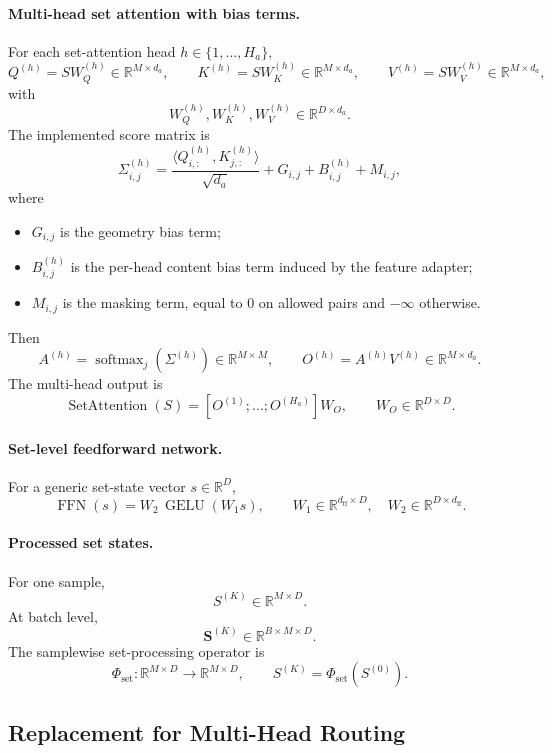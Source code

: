 \paragraph{Multi-head set attention with bias terms.}
For each set-attention head \(h\in\{1,\dots,H_a\}\),
\[
Q^{(h)} = S W_Q^{(h)} \in \mathbb R^{M\times d_a},
\qquad
K^{(h)} = S W_K^{(h)} \in \mathbb R^{M\times d_a},
\qquad
V^{(h)} = S W_V^{(h)} \in \mathbb R^{M\times d_a},
\]
with
\[
W_Q^{(h)},W_K^{(h)},W_V^{(h)}\in\mathbb R^{D\times d_a}.
\]
The implemented score matrix is
\[
\Sigma^{(h)}_{i,j}
=
\frac{\langle Q^{(h)}_{i,:},K^{(h)}_{j,:}\rangle}{\sqrt{d_a}}
+ G_{i,j}
+ B^{(h)}_{i,j}
+ M_{i,j},
\]
where
\begin{itemize}
    \item \(G_{i,j}\) is the geometry bias term;
    \item \(B_{i,j}^{(h)}\) is the per-head content bias term induced by the feature adapter;
    \item \(M_{i,j}\) is the masking term, equal to \(0\) on allowed pairs and \(-\infty\) otherwise.
\end{itemize}
Then
\[
A^{(h)}=\operatorname{softmax}_j(\Sigma^{(h)})\in\mathbb R^{M\times M},
\qquad
O^{(h)}=A^{(h)}V^{(h)}\in\mathbb R^{M\times d_a}.
\]
The multi-head output is
\[
\operatorname{SetAttention}(S)
=
[O^{(1)};\dots;O^{(H_a)}]W_O,
\qquad
W_O\in\mathbb R^{D\times D}.
\]

\paragraph{Set-level feedforward network.}
For a generic set-state vector \(s\in\mathbb R^D\),
\[
\operatorname{FFN}(s)=W_2\,\operatorname{GELU}(W_1 s),
\qquad
W_1\in\mathbb R^{d_{\mathrm{ff}}\times D},
\quad
W_2\in\mathbb R^{D\times d_{\mathrm{ff}}}.
\]

\paragraph{Processed set states.}
For one sample,
\[
S^{(K)}\in\mathbb R^{M\times D}.
\]
At batch level,
\[
\mathbf S^{(K)}\in\mathbb R^{B\times M\times D}.
\]
The samplewise set-processing operator is
\[
\Phi_{\mathrm{set}}:\mathbb R^{M\times D}\to\mathbb R^{M\times D},
\qquad
S^{(K)}=\Phi_{\mathrm{set}}(S^{(0)}).
\]

\subsection*{Replacement for Multi-Head Routing}

